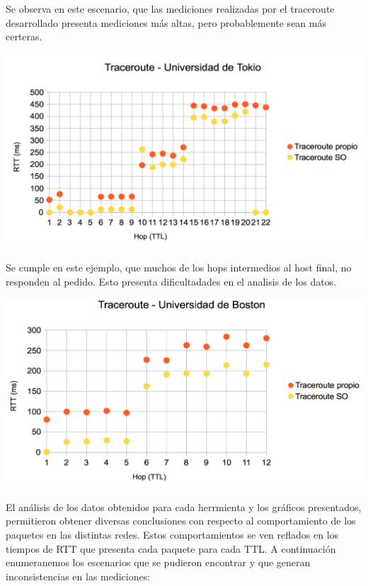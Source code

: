 Se observa en este escenario, que las mediciones realizadas por el traceroute desarrollado presenta mediciones más altas, pero probablemente sean más certeras. 

\centerline{\includegraphics[width=1\textwidth]{imagenes/1ra_parte/Japon_1ergrafico.png}}

Se cumple en este ejemplo, que muchos de los hops intermedios al host final, no responden al pedido. Esto presenta dificultadades en el analisis de los datos. 

\centerline{\includegraphics[width=1\textwidth]{imagenes/1ra_parte/EEUU_1ergrafico.png}}

El análisis de los datos obtenidos para cada herrmienta y los gráficos presentados, permitieron obtener diversas conclusiones con respecto al comportamiento de los paquetes en las distintas redes. Estos comportamientos se ven reflados en los tiempos de RTT que presenta cada paquete para cada TTL. A continuación enumeranemos los escenarios que se pudieron encontrar y que generan inconsistencias en las mediciones:

